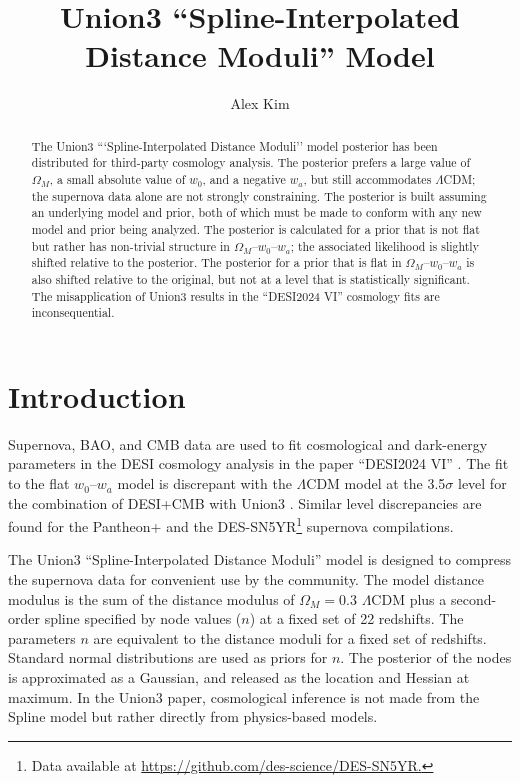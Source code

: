 \documentclass{aastex631}
\begin{document}
\title{Union3 ``Spline-Interpolated Distance Moduli'' Model}
\author[0000-0001-6315-8743]{Alex Kim}

\begin{abstract}
The Union3 ```Spline-Interpolated Distance Moduli'' model posterior has been distributed for third-party cosmology analysis. The posterior prefers a large value of
$\Omega_M$, a small absolute value of $w_0$, and a negative $w_a$, but still accommodates  $\Lambda$CDM; the supernova data alone are not strongly constraining.  The posterior is built assuming an underlying model and prior, both of which must be made to conform with any new model and prior being analyzed.
The posterior is calculated for
a  prior that is not flat but rather has non-trivial structure in $\Omega_M$--$w_0$--$w_a$;
the associated likelihood is slightly shifted relative to the posterior.
The  posterior for a prior that is flat in $\Omega_M$--$w_0$--$w_a$ is also shifted relative to the original, but not
at a level that is  statistically significant.    The misapplication of Union3 results in the  ``DESI2024 VI'' cosmology
fits are inconsequential.
\end{abstract}


\section{Introduction}
Supernova, BAO, and CMB data are used to fit cosmological and dark-energy parameters in the DESI cosmology
analysis in the paper ``DESI2024 VI''  \citep{2024arXiv240403002D}.  The fit to the flat $w_0$--$w_a$ model is discrepant with the $\Lambda$CDM
model at the 3.5$\sigma$ level for the combination of DESI+CMB with Union3  \cite{2023arXiv231112098R}.
Similar level discrepancies are found for the Pantheon+ \cite{2022ApJ...938..113S} and the DES-SN5YR\footnote{Data available at \url{https://github.com/des-science/DES-SN5YR.}} supernova compilations.

The Union3 ``Spline-Interpolated Distance Moduli'' model is designed to compress the  supernova data for convenient use by the community.  
The  model distance modulus
is the sum of the distance modulus of $\Omega_M=0.3$  $\Lambda$CDM plus a second-order spline specified by node values ($n$)
at a fixed set of 22 redshifts. 
The parameters $n$ are equivalent to the distance moduli for a fixed set of redshifts.
Standard normal distributions are used as priors for $n$.  
The posterior of the nodes is approximated as a Gaussian, and released as the location and Hessian at maximum.
In the Union3 paper, cosmological inference is not made from the Spline model but rather directly from physics-based models.
\end{document}
